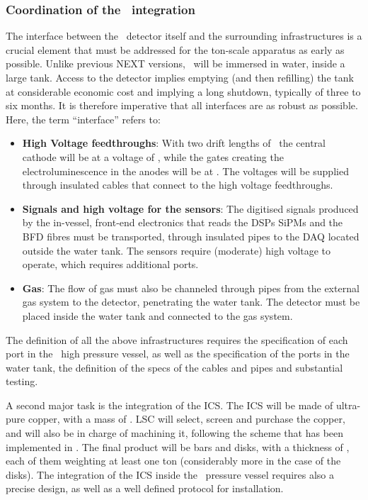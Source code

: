 \subsubsection*{Coordination of the \NHD\ integration}

The interface between the \NHD\ detector itself and the surrounding infrastructures is a crucial element that must be addressed for the ton-scale apparatus as early as possible. Unlike previous NEXT versions, \NHD\ will be immersed in water, inside a large tank. Access to the detector implies emptying (and then refilling) the tank at considerable economic cost and implying a long shutdown, typically of three to six  months. It is therefore imperative that all interfaces are as robust as possible. Here, the term ``interface'' refers to:

\begin{itemize}[noitemsep,topsep=0pt,parsep=0pt,partopsep=0pt]
\item 
{\bf High Voltage feedthroughs}:  With two drift lengths of \XHDL\ the central cathode will be at a voltage of \XHDHV, while the gates creating the electroluminescence in the anodes will be at \XHDELHV. The voltages will be supplied through insulated cables that connect to the high voltage feedthroughs. 
\item 
{\bf Signals and high voltage for the sensors}:  The digitised signals produced by the in-vessel, front-end electronics that reads the DSPs SiPMs and the BFD fibres must be transported, through insulated pipes to the DAQ located outside the water tank. The sensors require (moderate) high voltage to operate, which requires additional ports.
\item 
{\bf Gas}: The flow of gas must also be channeled through pipes from the external gas system to the detector, penetrating the water tank. The detector must be placed inside the water tank and connected to the gas system. 
\end{itemize}


The {definition} of all the above infrastructures requires the specification of each port in the \NHD\ high pressure vessel, as well as the specification of the ports in the water tank, the definition of the specs of the cables and pipes and substantial testing. 

A second major task is the integration of the ICS. The ICS will be made of ultra-pure copper, with a mass of \XHDS. LSC will select, screen and purchase the copper, and will also be in charge of machining it, following the scheme that has been implemented in \Next. The final product will be bars and disks, with a thickness of \XHDCS, each of them weighting at least one ton (considerably more in the case of the disks). The integration of the ICS inside the \NHD\ pressure vessel requires also a precise design, as well as a well defined protocol for installation. 

